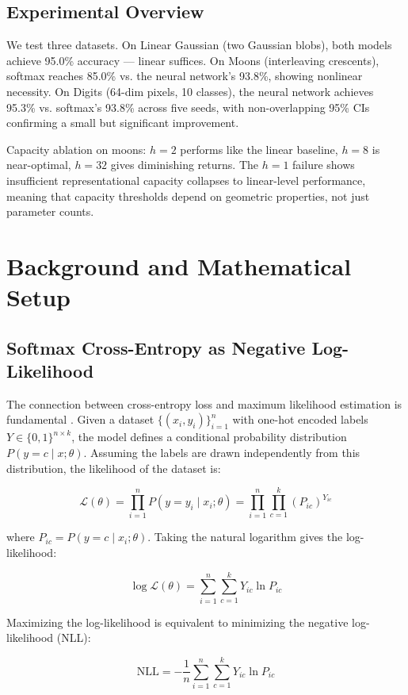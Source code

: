 \documentclass[sigconf,screen,nonacm,nofonts]{acmart}
\begin{document}
\subsection{Experimental Overview}

We test three datasets. On Linear Gaussian (two Gaussian blobs), both models achieve 95.0\% accuracy — linear suffices. On Moons (interleaving crescents), softmax reaches 85.0\% vs. the neural network's 93.8\%, showing nonlinear necessity. On Digits (64-dim pixels, 10 classes), the neural network achieves 95.3\% vs. softmax's 93.8\% across five seeds, with non-overlapping 95\% CIs confirming a small but significant improvement.

Capacity ablation on moons: \(h=2\) performs like the linear baseline, \(h=8\) is near-optimal, \(h=32\) gives diminishing returns. The \(h=1\) failure shows insufficient representational capacity collapses to linear-level performance, meaning that capacity thresholds depend on geometric properties, not just parameter counts.

\section{Background and Mathematical Setup}

\subsection{Softmax Cross-Entropy as Negative Log-Likelihood}

The connection between cross-entropy loss and maximum likelihood estimation is fundamental \cite{murphy2022pml}. Given a dataset \(\{(x_i, y_i)\}_{i=1}^n\) with one-hot encoded labels \(Y \in \{0,1\}^{n \times k}\), the model defines a conditional probability distribution \(P(y = c \mid x; \theta)\). Assuming the labels are drawn independently from this distribution, the likelihood of the dataset is:

\[
\mathcal{L}(\theta) = \prod_{i=1}^n P(y = y_i \mid x_i; \theta) = \prod_{i=1}^n \prod_{c=1}^k (P_{ic})^{Y_{ic}}
\]

where \(P_{ic} = P(y = c \mid x_i; \theta)\). Taking the natural logarithm gives the log-likelihood:

\[
\log \mathcal{L}(\theta) = \sum_{i=1}^n \sum_{c=1}^k Y_{ic} \ln P_{ic}
\]

Maximizing the log-likelihood is equivalent to minimizing the negative log-likelihood (NLL):

\[
\text{NLL} = -\frac{1}{n} \sum_{i=1}^n \sum_{c=1}^k Y_{ic} \ln P_{ic}
\]
\end{document}
